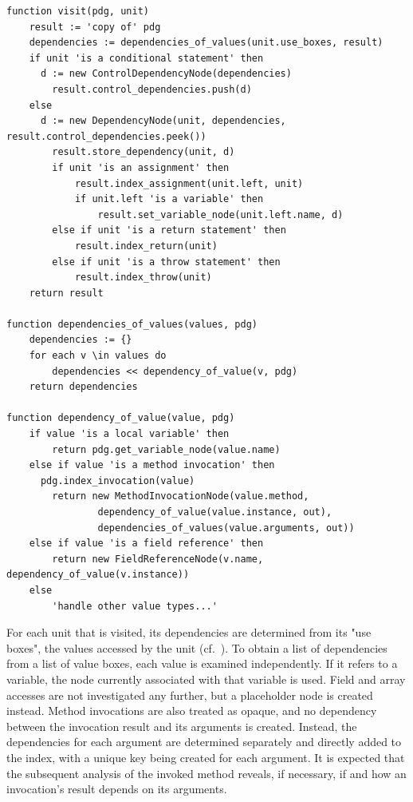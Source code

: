 \begin{lstlisting}[firstnumber=1,float,caption={The algorithm of the visit operation.},stepnumber=5,label=lst:visit,gobble=0,language=algorithm,tabsize=2]
function visit(pdg, unit)
	result := 'copy of' pdg
	dependencies := dependencies_of_values(unit.use_boxes, result)
	if unit 'is a conditional statement' then
	  d := new ControlDependencyNode(dependencies)
		result.control_dependencies.push(d)
	else
	  d := new DependencyNode(unit, dependencies, result.control_dependencies.peek())
		result.store_dependency(unit, d)
		if unit 'is an assignment' then
			result.index_assignment(unit.left, unit)
			if unit.left 'is a variable' then
				result.set_variable_node(unit.left.name, d)
		else if unit 'is a return statement' then
			result.index_return(unit)
		else if unit 'is a throw statement' then
			result.index_throw(unit)
	return result

function dependencies_of_values(values, pdg)
	dependencies := {}
	for each v \in values do
		dependencies << dependency_of_value(v, pdg)
	return dependencies

function dependency_of_value(value, pdg)
	if value 'is a local variable' then
		return pdg.get_variable_node(value.name)
	else if value 'is a method invocation' then
	  pdg.index_invocation(value)
		return new MethodInvocationNode(value.method, 
				dependency_of_value(value.instance, out), 
				dependencies_of_values(value.arguments, out))
	else if value 'is a field reference' then
		return new FieldReferenceNode(v.name, dependency_of_value(v.instance))
	else 
		'handle other value types...'
\end{lstlisting}

For each unit that is visited, its dependencies are determined from its "use boxes", the values accessed by the unit (cf.~).
\tmpStart
To obtain a list of dependencies from a list of value boxes, each value is examined independently.
If it refers to a variable, the node currently associated with that variable is used.
Field and array accesses are not investigated any further, but a placeholder node is created instead.
Method invocations are also treated as opaque, and no dependency between the invocation result and its arguments is created.
Instead, the dependencies for each argument are determined separately and directly added to the index, with a unique key being created for each argument.
It is expected that the subsequent analysis of the invoked method reveals, if necessary, if and how an invocation's result depends on its arguments.
\tmpEnd

